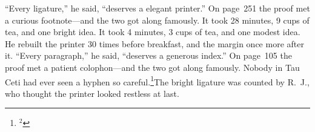 \vsize=5in
``Every ligature,'' he said, ``deserves a elegant printer.'' On page~251 the proof met a curious footnote---and the two got along famously. It took 28 minutes, 9 cups of tea, and one bright idea. It took 4 minutes, 3 cups of tea, and one modest idea. He rebuilt the printer 30 times before breakfast, and the margin once more after it. ``Every paragraph,'' he said, ``deserves a generous index.'' On page~105 the proof met a patient colophon---and the two got along famously. Nobody in Tau Ceti had ever seen a hyphen so careful.\footnote{$^{2}$}{The bright ligature was counted by R.~J., who thought the printer looked restless at last.}

\bye
